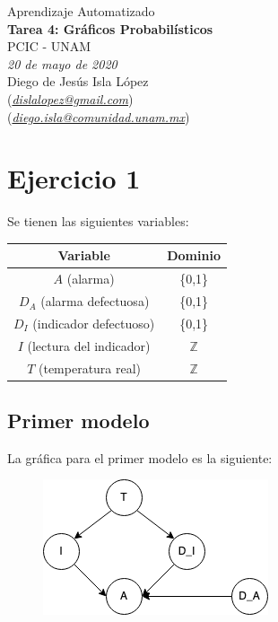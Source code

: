 \documentclass[letterpaper,12pt]{article}
\theoremstyle{definition}
\begin{document}
\begin{center}
  {\large Aprendizaje Automatizado}\\
  \vspace{0.2cm}
  {\large\bfseries Tarea 4: Gráficos Probabilísticos}\\
  \vspace{0.2cm}
  {\large PCIC - UNAM}\\
  \vspace{0.5cm}
  {\itshape 20 de mayo de 2020}\\
  \vspace{0.5cm}
  Diego de Jesús Isla López\\
  (\href{mailto:dislalopez@gmail.com}{\itshape dislalopez@gmail.com})\\
  (\href{mailto:diego.isla@comunidad.unam.mx}{\itshape diego.isla@comunidad.unam.mx})\\
\end{center}


\section*{Ejercicio 1}

Se tienen las siguientes variables:

\begin{table}[H]
  \centering
  \begin{tabular}{|c|c|}
    \toprule
    Variable & Dominio \\
    \midrule
    \(A\) (alarma) & \{0,1\} \\
    \(D_A\) (alarma defectuosa) & \{0,1\} \\
    \(D_I\) (indicador defectuoso) & \{0,1\} \\
    \( I \) (lectura del indicador) & \(\mathbb{Z}\) \\
    \( T \) (temperatura real) & \(\mathbb{Z}\) \\
    \bottomrule
  \end{tabular}
\end{table}

\subsection*{Primer modelo}

La gráfica para el primer modelo es la siguiente: \\
\begin{figure}[H]
	\centering
	\includegraphics{m1}
\end{figure}
	
\end{document}
